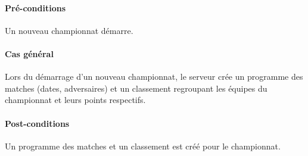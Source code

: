 \paragraph{Pré-conditions}
\begin{list}{}{\leftmargin=1.5em}
\item{Un nouveau championnat démarre.}
\end{list}
\paragraph{Cas général}
Lors du démarrage d'un nouveau championnat, le serveur crée un programme des matches (dates, adversaires) et un classement regroupant les équipes du championnat et leurs points respectifs.
\paragraph{Post-conditions}
\begin{list}{}{\leftmargin=1.5em}
\item{Un programme des matches et un classement est créé pour le championnat.}
\end{list}